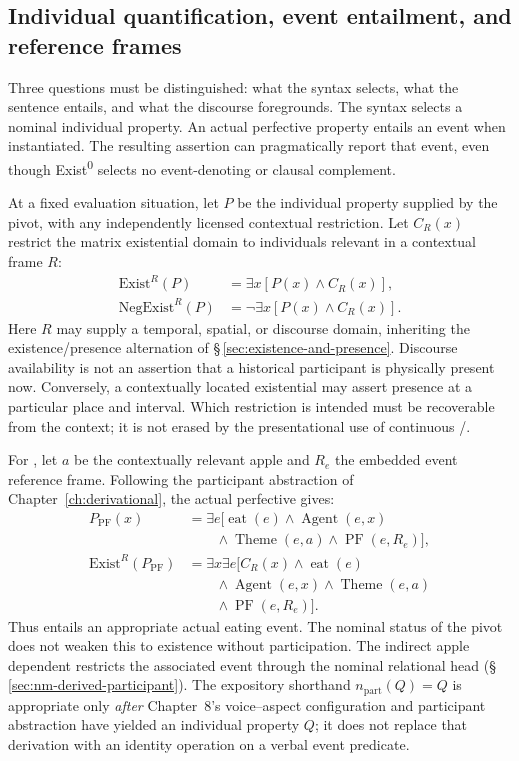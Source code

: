 \subsection{Individual quantification, event entailment, and reference frames}
\label{sec:exst-quantification}

Three questions must be distinguished: what the syntax selects, what the
sentence entails, and what the discourse foregrounds. The syntax selects a
nominal individual property. An actual perfective property entails an event
when instantiated. The resulting assertion can pragmatically report that
event, even though Exist\textsuperscript{0} selects no event-denoting or
clausal complement.

At a fixed evaluation situation, let $P$ be the individual property supplied
by the pivot, with any independently licensed contextual restriction.
Let $C_R(x)$ restrict the
matrix existential domain to individuals relevant in a contextual frame $R$:
\[
\begin{aligned}
 \mathrm{Exist}^{R}(P)&=\exists x[P(x)\land C_R(x)],\\
 \mathrm{NegExist}^{R}(P)&=\neg\exists x[P(x)\land C_R(x)].
\end{aligned}
\]
Here $R$ may supply a temporal, spatial, or discourse domain, inheriting the
existence/presence alternation of §\,\ref{sec:existence-and-presence}.
Discourse availability is not an assertion that a historical participant is
physically present now. Conversely, a contextually located existential may
assert presence at a particular place and interval. Which restriction is
intended must be recoverable from the context; it is not erased by the
presentational use of continuous /.

For , let $a$ be the contextually relevant apple and
$R_e$ the embedded event reference frame. Following the participant
abstraction of Chapter~\ref{ch:derivational}, the actual perfective gives:
\[
\begin{aligned}
 P_{\mathrm{PF}}(x)&=\exists e[\operatorname{eat}(e)
 \land\operatorname{Agent}(e,x)\\
 &\qquad\land\operatorname{Theme}(e,a)\land\operatorname{PF}(e,R_e)],\\
 \mathrm{Exist}^{R}(P_{\mathrm{PF}})&=\exists x\exists e[
 C_R(x)\land\operatorname{eat}(e)\\
 &\qquad\land\operatorname{Agent}(e,x)\land\operatorname{Theme}(e,a)\\
 &\qquad\land\operatorname{PF}(e,R_e)].
\end{aligned}
\]
Thus  entails an appropriate actual eating event.
The nominal status of the pivot does not weaken this to existence without
participation. The indirect apple dependent restricts the associated event
through the nominal relational head (§\,\ref{sec:nm-derived-participant}).
The expository shorthand $n_{\mathrm{part}}(Q)=Q$ is appropriate only
\emph{after} Chapter~8's voice--aspect configuration and participant
abstraction have yielded an individual property $Q$; it does not replace
that derivation with an identity operation on a verbal event predicate.

